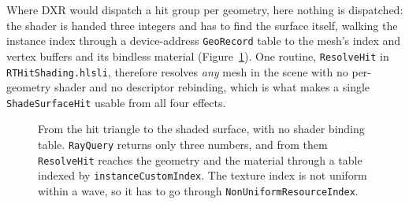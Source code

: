 Where DXR would dispatch a hit group per geometry, here nothing is dispatched: the shader is handed
three integers and has to find the surface itself, walking the instance index through a
device-address \texttt{GeoRecord} table to the mesh's index and vertex buffers and its bindless
material (Figure~\ref{fig:hitresolve}). One routine, \texttt{ResolveHit} in
\texttt{RTHitShading.hlsli}, therefore resolves \emph{any} mesh in the scene with no per-geometry
shader and no descriptor rebinding, which is what makes a single \texttt{ShadeSurfaceHit} usable from
all four effects.

\begin{figure}[tbp]
\centering
{}
\caption[Hit resolution through the bindless geometry table]{From the hit triangle to the shaded
surface, with no shader binding table. \texttt{RayQuery} returns only three numbers, and from them
\texttt{ResolveHit} reaches the geometry and the material through a table indexed by
\texttt{instanceCustomIndex}. The texture index is not uniform within a wave, so it has to go through
\texttt{NonUniformResourceIndex}.}
\label{fig:hitresolve}
\end{figure}

